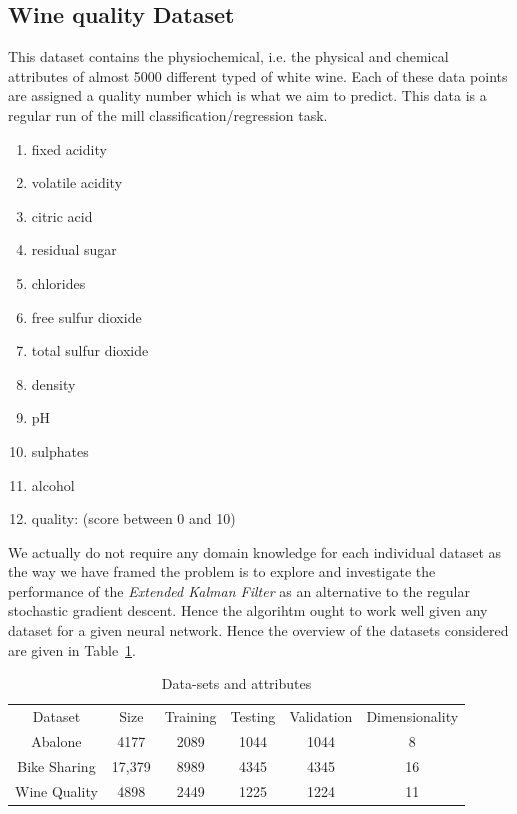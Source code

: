 \documentclass{article}
\begin{document}
\subsection{Wine quality Dataset}
This dataset contains the physiochemical, i.e. the physical and chemical attributes of almost 5000 different typed of white wine. Each of these data points are assigned a quality number which is what we aim to predict. This data is a regular run of the mill classification/regression task. 
\begin{enumerate}
   \item fixed acidity
   \item volatile acidity
   \item citric acid
   \item residual sugar
   \item chlorides
   \item free sulfur dioxide
   \item total sulfur dioxide
   \item density
   \item pH
   \item sulphates
   \item alcohol
   \item quality: (score between 0 and 10)
\end{enumerate}

We actually do not require any domain knowledge for each individual dataset as the way we have framed the problem is to explore and investigate the performance of the \textit{Extended Kalman Filter} as an alternative to the regular stochastic gradient descent. Hence the algorihtm ought to work well given any dataset for a given neural network. Hence the overview of the datasets considered are given in Table~\ref{tab:datasets}.  
\begin{table}[ht]
    \centering
    \begin{tabular}{cccccc}
        \hline
         Dataset &  Size & Training & Testing & Validation & Dimensionality\\ \hhline{======}
         Abalone & 4177 &2089 &1044 &1044 &8 \\
         Bike Sharing & 17,379 & 8989 & 4345 & 4345 & 16\\
         Wine Quality & 4898 & 2449 &1225& 1224 & 11\\
         \hline
    \end{tabular}
    \caption{Data-sets and attributes}
    \label{tab:datasets}
\end{table}
\end{document}
